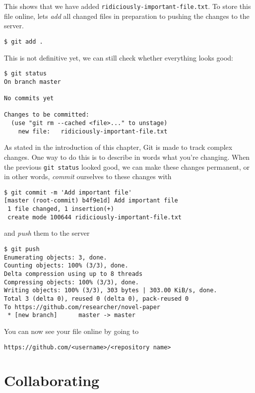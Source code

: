 \documentclass[
  14pt
  american,
  paper=a4,
  ,captions=tableheading
]{scrbook}
\newcommand{\passthrough}[1]{#1}
\begin{document}
This shows that we have added
\passthrough{\lstinline!ridiciously-important-file.txt!}. To store this
file online, lets \emph{add} all changed files in preparation to pushing
the changes to the server.

\begin{lstlisting}
$ git add .
\end{lstlisting}

This is not definitive yet, we can still check whether everything looks
good:

\begin{lstlisting}
$ git status
On branch master

No commits yet

Changes to be committed:
  (use "git rm --cached <file>..." to unstage)
    new file:   ridiciously-important-file.txt
\end{lstlisting}

As stated in the introduction of this chapter, Git is made to track
complex changes. One way to do this is to describe in words what you're
changing. When the previous \passthrough{\lstinline!git status!} looked
good, we can make these changes permanent, or in other words,
\emph{commit} ourselves to these changes with

\begin{lstlisting}
$ git commit -m 'Add important file'
[master (root-commit) b4f9e1d] Add important file
 1 file changed, 1 insertion(+)
 create mode 100644 ridiciously-important-file.txt
\end{lstlisting}

and \emph{push} them to the server

\begin{lstlisting}
$ git push
Enumerating objects: 3, done.
Counting objects: 100% (3/3), done.
Delta compression using up to 8 threads
Compressing objects: 100% (3/3), done.
Writing objects: 100% (3/3), 303 bytes | 303.00 KiB/s, done.
Total 3 (delta 0), reused 0 (delta 0), pack-reused 0
To https://github.com/researcher/novel-paper
 * [new branch]      master -> master
\end{lstlisting}

You can now see your file online by going to

\begin{lstlisting}
https://github.com/<username>/<repository name>
\end{lstlisting}

\hypertarget{sec:git-collaborating}{%
\section{Collaborating}\label{sec:git-collaborating}}
\end{document}
